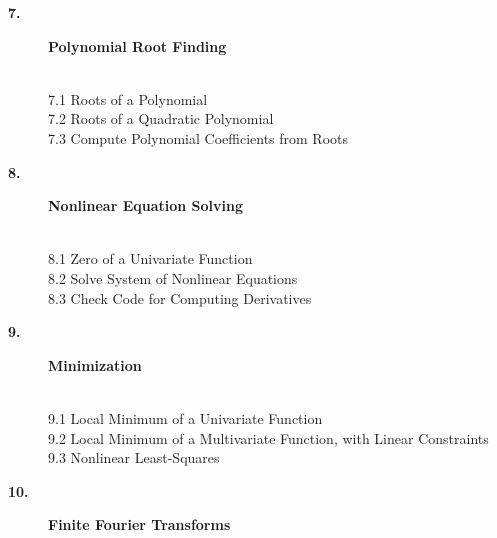 \documentclass[twoside]{MATH77}
\begin{document}
\begin{description}
\item[\large \bf 7.]  {\large {\bf Polynomial Root Finding}}

\vspace{-20pt}
\begin{tabbing}
\hspace{.45in}\=\\
\phantom{1}7.1 \> Roots of a Polynomial\\
\phantom{1}7.2 \> Roots of a Quadratic Polynomial\\
\phantom{1}7.3 \> Compute Polynomial Coefficients from Roots\\
\end{tabbing}\vspace{-15pt}

\item[\large \bf 8.]  {\large {\bf Nonlinear Equation Solving}}

\vspace{-20pt}
\begin{tabbing}
\hspace{.45in}\=\\
\phantom{1}8.1 \> Zero of a Univariate Function\\
\phantom{1}8.2 \> Solve System of Nonlinear Equations\\
\phantom{1}8.3 \> Check Code for Computing Derivatives\\
\end{tabbing}\vspace{-15pt}

\item[\large \bf 9.]  {\large {\bf Minimization}}

\vspace{-20pt}
\begin{tabbing}
\hspace{.45in}\=\\
\phantom{1}9.1 \> Local Minimum of a Univariate Function\\
\phantom{1}9.2 \> Local Minimum of a Multivariate Function, with Linear Constraints\\
\phantom{1}9.3 \> Nonlinear Least-Squares\\
\end{tabbing}\vspace{-15pt}

\item[\large \bf 10.]  {\large {\bf Finite Fourier Transforms}}


\end{description}
\end{document}
